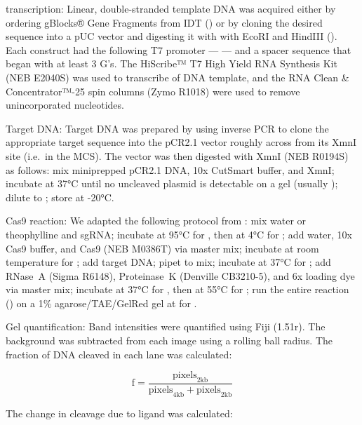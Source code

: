 \documentclass[10pt,oneside]{article}
\begin{document}
\Invitro{} transcription: Linear, double-stranded template DNA was acquired 
either by ordering gBlocks® Gene Fragments from IDT () or by cloning 
the desired sequence into a pUC vector and digesting it with with EcoRI and 
HindIII ().  Each construct had the following T7 promoter --- 
 --- and a spacer sequence that began with at 
least 3 G's.  The HiScribe™ T7 High Yield RNA Synthesis Kit (NEB E2040S) was 
used to transcribe  of DNA template, and the RNA Clean \& 
Concentrator™-25 spin columns (Zymo R1018) were used to remove unincorporated 
nucleotides.

Target DNA: Target DNA was prepared by using inverse PCR to clone the 
appropriate target sequence into the pCR2.1 vector roughly across from its XmnI 
site (i.e.\ in the MCS).  The vector was then digested with XmnI (NEB R0194S) 
as follows: mix   miniprepped pCR2.1 DNA,  10x 
CutSmart buffer, and   XmnI; incubate at 37°C until no 
uncleaved plasmid is detectable on a gel (usually ); dilute to 
; store at -20°C.  

Cas9 reaction: We adapted the following protocol from : 
mix  water or  theophylline and   sgRNA; 
incubate at 95°C for , then at 4°C for ; add  water, 
 10x Cas9 buffer, and   Cas9 (NEB M0386T) via master 
mix; incubate at room temperature for ; add   target 
DNA; pipet to mix; incubate at 37°C for ; add   RNase~A 
(Sigma R6148),   Proteinase~K (Denville CB3210-5), and 
 6x loading dye via master mix; incubate at 37°C for , then 
at 55°C for ; run the entire reaction () on a 1\% 
agarose/TAE/GelRed gel at  for .

Gel quantification: Band intensities were quantified using Fiji (1.51r).  The 
background was subtracted from each image using a  rolling ball radius.  
The fraction of DNA cleaved in each lane was calculated:

\begin{displaymath}
 \mathrm{f} = \frac{\mathrm{pixels}_\mathrm{2kb}}{\mathrm{pixels}_\mathrm{4kb} 
 + \mathrm{pixels}_\mathrm{2kb}}
\end{displaymath}

The change in cleavage due to ligand was calculated: 
\end{document}
